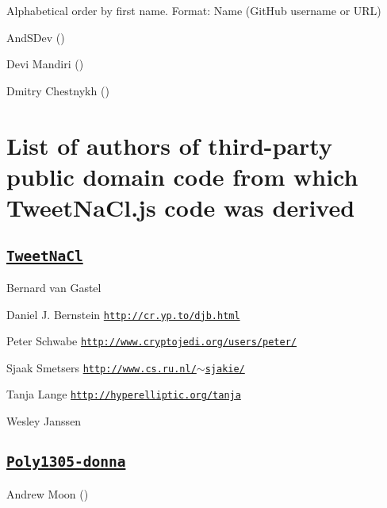 Alphabetical order by first name. Format\+: Name (Git\+Hub username or U\+RL)


\begin{DoxyItemize}
\item And\+S\+Dev ()
\item Devi Mandiri ()
\item Dmitry Chestnykh ()
\end{DoxyItemize}

\section*{List of authors of third-\/party public domain code from which Tweet\+Na\+Cl.\+js code was derived }

\subsection*{\href{http://tweetnacl.cr.yp.to/}{\tt Tweet\+Na\+Cl} }


\begin{DoxyItemize}
\item Bernard van Gastel
\item Daniel J. Bernstein \href{http://cr.yp.to/djb.html}{\tt http\+://cr.\+yp.\+to/djb.\+html}
\item Peter Schwabe \href{http://www.cryptojedi.org/users/peter/}{\tt http\+://www.\+cryptojedi.\+org/users/peter/}
\item Sjaak Smetsers \href{http://www.cs.ru.nl/~sjakie/}{\tt http\+://www.\+cs.\+ru.\+nl/$\sim$sjakie/}
\item Tanja Lange \href{http://hyperelliptic.org/tanja}{\tt http\+://hyperelliptic.\+org/tanja}
\item Wesley Janssen
\end{DoxyItemize}

\subsection*{\href{https://github.com/floodyberry/poly1305-donna}{\tt Poly1305-\/donna} }


\begin{DoxyItemize}
\item Andrew Moon () 
\end{DoxyItemize}